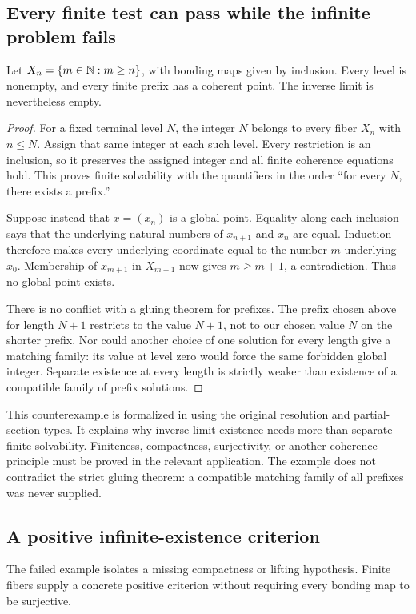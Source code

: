 \subsection{Every finite test can pass while the infinite problem fails}
\begin{KSexample}\label{KS:KS54}
Let \(X_n=\{m\in\mathbb N:m\ge n\}\), with bonding maps given by inclusion. Every level is nonempty, and every finite prefix has a coherent point. The inverse limit is nevertheless empty.
\end{KSexample}
\begin{proof}
For a fixed terminal level \(N\), the integer \(N\) belongs to every fiber \(X_n\) with \(n\le N\). Assign that same integer at each such level. Every restriction is an inclusion, so it preserves the assigned integer and all finite coherence equations hold. This proves finite solvability with the quantifiers in the order ``for every \(N\), there exists a prefix.''

Suppose instead that \(x=(x_n)\) is a global point. Equality along each inclusion says that the underlying natural numbers of \(x_{n+1}\) and \(x_n\) are equal. Induction therefore makes every underlying coordinate equal to the number \(m\) underlying \(x_0\). Membership of \(x_{m+1}\) in \(X_{m+1}\) now gives \(m\ge m+1\), a contradiction. Thus no global point exists.

There is no conflict with a gluing theorem for prefixes. The prefix chosen above for length \(N+1\) restricts to the value \(N+1\), not to our chosen value \(N\) on the shorter prefix. Nor could another choice of one solution for every length give a matching family: its value at level zero would force the same forbidden global integer. Separate existence at every length is strictly weaker than existence of a compatible family of prefix solutions.
\end{proof}
This counterexample is formalized in  using the original resolution and partial-section types. It explains why inverse-limit existence needs more than separate finite solvability. Finiteness, compactness, surjectivity, or another coherence principle must be proved in the relevant application. The example does not contradict the strict gluing theorem: a compatible matching family of all prefixes was never supplied.

\subsection{A positive infinite-existence criterion}
The failed example isolates a missing compactness or lifting hypothesis. Finite fibers supply a concrete positive criterion without requiring every bonding map to be surjective.

